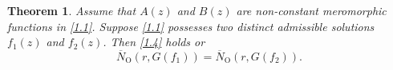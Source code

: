 \documentclass{amsart}
\newtheorem{theorem}{Theorem}[section]
\begin{document}
\begin{theorem}\label{thm5.1}
Assume that $A(z)$ and $B(z)$ are non-constant meromorphic functions in \eqref{1.1}.
Suppose \eqref{1.1} possesses two distinct admissible solutions $f_1(z)$ and $f_2(z)$. Then \eqref{1.4} holds or
\begin{equation}
\overline N_{\text{O}}(r,G(f_1))=\overline N_{\text{O}}(r,G(f_2)).\label{5.2}
\end{equation}
\end{theorem}

\end{document}
